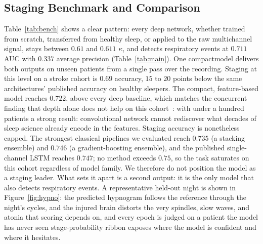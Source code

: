 \documentclass[preprint,12pt]{elsarticle}
\newcommand{\mmAcc}{0.722}
\newcommand{\mmK}{0.611}
\newcommand{\mmAuc}{0.711}
\newcommand{\mmAp}{0.337}
\providecommand{\DIFaddtex}[1]{{\protect\color{blue} \sf #1}} %
\providecommand{\DIFdeltex}[1]{{\protect\color{red} \scriptsize #1}} %
\providecommand{\DIFaddbegin}{} %
\providecommand{\DIFaddend}{} %
\providecommand{\DIFdelbegin}{} %
\providecommand{\DIFdelend}{} %
\providecommand{\DIFadd}[1]{\texorpdfstring{\DIFaddtex{#1}}{#1}} %
\providecommand{\DIFdel}[1]{\texorpdfstring{\DIFdeltex{#1}}{}} %
\providecommand{\DIFscaledelfig}{0.5}
\newlength{\DIFdelgraphicswidth} %
\newlength{\DIFdelgraphicsheight} %
\providecommand{\DIFaddincludegraphics}[2][]{{\color{blue}\fbox{\DIFOincludegraphics[#1]{#2}}}} %
\providecommand{\DIFdelincludegraphics}[2][]{%
\sbox{\DIFdelgraphicsbox}{\DIFOincludegraphics[#1]{#2}}%
\settoboxwidth{\DIFdelgraphicswidth}{\DIFdelgraphicsbox} %
\settoboxtotalheight{\DIFdelgraphicsheight}{\DIFdelgraphicsbox} %
\scalebox{\DIFscaledelfig}{%
\parbox[b]{\DIFdelgraphicswidth}{\usebox{\DIFdelgraphicsbox}\\[-\baselineskip] \rule{\DIFdelgraphicswidth}{0em}}\llap{\resizebox{\DIFdelgraphicswidth}{\DIFdelgraphicsheight}{%
\setlength{\unitlength}{\DIFdelgraphicswidth}%
\begin{picture}(1,1)%
\thicklines\linethickness{2pt} %
{\color[rgb]{1,0,0}\put(0,0){\framebox(1,1){}}}%
{\color[rgb]{1,0,0}\put(0,0){\line( 1,1){1}}}%
{\color[rgb]{1,0,0}\put(0,1){\line(1,-1){1}}}%
\end{picture}%
}\hspace*{3pt}}} %
} %
\DeclareRobustCommand{\DIFaddbegin}{\DIFOaddbegin \let\includegraphics\DIFaddincludegraphics} %
\DeclareRobustCommand{\DIFaddend}{\DIFOaddend \let\includegraphics\DIFOincludegraphics} %
\DeclareRobustCommand{\DIFdelbegin}{\DIFOdelbegin \let\includegraphics\DIFdelincludegraphics} %
\DeclareRobustCommand{\DIFdelend}{\DIFOaddend \let\includegraphics\DIFOincludegraphics} %
\begin{document}
\subsection{\DIFadd{Staging Benchmark and Comparison}}
\DIFadd{Table~\ref{tab:bench} shows a clear pattern: every deep network, whether trained from scratch,
transferred from healthy sleep, or applied to the raw multichannel signal, stays between $0.61$
}\DIFaddend and \DIFdelbegin \DIFdel{$\mmK$ $\kappa$, and detects
respiratory events at $\mmAuc$ AUC with $\mmAp$ average precision (Table~\ref{tab:main}). One
compactmodel delivers both outputs on unseen patients from a single pass over the recording. Staging at this level on a stroke cohort is }\DIFdelend \DIFaddbegin \DIFadd{$0.69$ accuracy, $15$ to $20$ points below the same architectures' published accuracy on
healthy sleepers. The compact, feature-based model reaches $\mmAcc$, above every deep baseline,
which matches the concurrent finding that depth alone does not help on this
cohort~\cite{bose2026gap}: with under a hundred patients }\DIFaddend a \DIFdelbegin \DIFdel{strong result: }\DIFdelend \DIFaddbegin \DIFadd{convolutional network cannot
rediscover what decades of sleep science already encode in the features. Staging accuracy is
nonetheless capped. The strongest classical pipelines we evaluated reach $0.735$ (a stacking
ensemble) and $0.746$ (a gradient-boosting ensemble), and the published single-channel LSTM
reaches $0.747$; no method exceeds $0.75$, so the task saturates on this cohort regardless of
model family. We therefore do not position the model as a staging leader. What sets it apart is
a second output: it is the only model that also detects respiratory events. A representative held-out night is
shown in Figure~\ref{fig:hypno}: the predicted hypnogram follows the reference through the
night's cycles, and }\DIFaddend the \DIFdelbegin \DIFdel{injured brain distorts the very spindles, slow waves, and atonia that scoring depends on, and every epoch is judged on a
patient the model has never seen}\DIFdelend \DIFaddbegin \DIFadd{stage-probability ribbon exposes where the model is confident and where
it hesitates}\DIFaddend .
\end{document}
